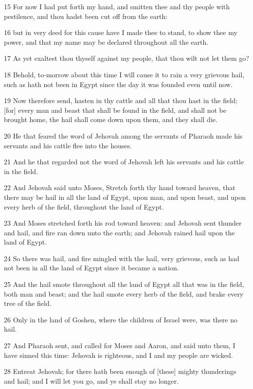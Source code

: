 \par 15 For now I had put forth my hand, and smitten thee and thy people with pestilence, and thou hadst been cut off from the earth:
\par 16 but in very deed for this cause have I made thee to stand, to show thee my power, and that my name may be declared throughout all the earth.
\par 17 As yet exaltest thou thyself against my people, that thou wilt not let them go?
\par 18 Behold, to-morrow about this time I will cause it to rain a very grievous hail, such as hath not been in Egypt since the day it was founded even until now.
\par 19 Now therefore send, hasten in thy cattle and all that thou hast in the field; [for] every man and beast that shall be found in the field, and shall not be brought home, the hail shall come down upon them, and they shall die.
\par 20 He that feared the word of Jehovah among the servants of Pharaoh made his servants and his cattle flee into the houses.
\par 21 And he that regarded not the word of Jehovah left his servants and his cattle in the field.
\par 22 And Jehovah said unto Moses, Stretch forth thy hand toward heaven, that there may be hail in all the land of Egypt, upon man, and upon beast, and upon every herb of the field, throughout the land of Egypt.
\par 23 And Moses stretched forth his rod toward heaven: and Jehovah sent thunder and hail, and fire ran down unto the earth; and Jehovah rained hail upon the land of Egypt.
\par 24 So there was hail, and fire mingled with the hail, very grievous, such as had not been in all the land of Egypt since it became a nation.
\par 25 And the hail smote throughout all the land of Egypt all that was in the field, both man and beast; and the hail smote every herb of the field, and brake every tree of the field.
\par 26 Only in the land of Goshen, where the children of Israel were, was there no hail.
\par 27 And Pharaoh sent, and called for Moses and Aaron, and said unto them, I have sinned this time: Jehovah is righteous, and I and my people are wicked.
\par 28 Entreat Jehovah; for there hath been enough of [these] mighty thunderings and hail; and I will let you go, and ye shall stay no longer.
